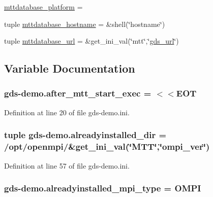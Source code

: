 \begin{DoxyCompactItemize}
\item 
\hyperlink{namespacegds-demo_a5b63d22833bd28b9d8409c376db882e4}{mttdatabase\-\_\-platform} =
\item 
tuple \hyperlink{namespacegds-demo_aa4de05678316043e454babc3bf6f66f8}{mttdatabase\-\_\-hostname} = \&shell(\char`\"{}hostname\char`\"{})
\item 
tuple \hyperlink{namespacegds-demo_ad067871dce5c5a51f34693d833b0e0ef}{mttdatabase\-\_\-url} = \&get\-\_\-ini\-\_\-val(\char`\"{}mtt\char`\"{},\char`\"{}\hyperlink{namespacegds-demo_a9d1bc7e10684b9a35809bd57826a72eb}{gds\-\_\-url}\char`\"{})
\end{DoxyCompactItemize}


\subsection{Variable Documentation}
\hypertarget{namespacegds-demo_a843952a47656e27f99b11351112482cc}{
\subsubsection[{after\-\_\-mtt\-\_\-start\-\_\-exec}]{\setlength{\rightskip}{0pt plus 5cm}gds-\/demo.\-after\-\_\-mtt\-\_\-start\-\_\-exec = $<$$<$E\-O\-T}}\label{namespacegds-demo_a843952a47656e27f99b11351112482cc}


Definition at line 20 of file gds-\/demo.\-ini.

\hypertarget{namespacegds-demo_a7d7eb3eb651697eb48935ef101d672b3}{
\subsubsection[{alreadyinstalled\-\_\-dir}]{\setlength{\rightskip}{0pt plus 5cm}tuple gds-\/demo.\-alreadyinstalled\-\_\-dir = /opt/openmpi/\&get\-\_\-ini\-\_\-val(\char`\"{}M\-T\-T\char`\"{},\char`\"{}{\bf ompi\-\_\-ver}\char`\"{})}}\label{namespacegds-demo_a7d7eb3eb651697eb48935ef101d672b3}


Definition at line 57 of file gds-\/demo.\-ini.

\hypertarget{namespacegds-demo_a7446952915af641c8b9627f3e310e818}{
\subsubsection[{alreadyinstalled\-\_\-mpi\-\_\-type}]{\setlength{\rightskip}{0pt plus 5cm}gds-\/demo.\-alreadyinstalled\-\_\-mpi\-\_\-type = O\-M\-P\-I}}\label{namespacegds-demo_a7446952915af641c8b9627f3e310e818}


